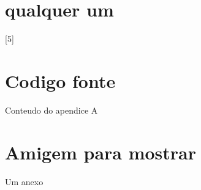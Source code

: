 \documentclass[12pt,twoside,oneright,a4paper,chapter=TITLE,english,brazil]{unipampa}
\begin{document}
    \chapter{qualquer um}
        
        [5]
        \Blindtext


        
\postextual     %


 
 
\apendices                      %

\chapter{Codigo fonte}
    Conteudo do apendice A
    \Blindtext
    \Blindtext


\anexos                         %

\chapter{Amigem para mostrar}
    Um anexo
    \Blindtext

    
%
\printindex             %
\end{document}
